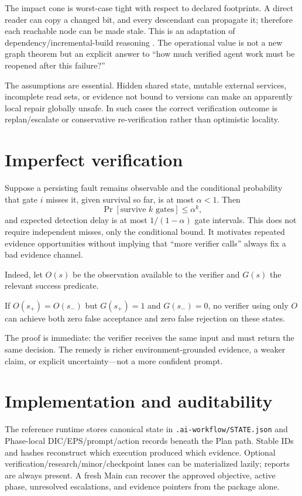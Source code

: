 \documentclass{article}
\begin{document}
The impact cone is worst-case tight with respect to declared footprints. A direct reader can copy a changed bit, and every descendant can propagate it; therefore each reachable node can be made stale. This is an adaptation of dependency/incremental-build reasoning \citep{mokhov2018build,acar2009selfadjusting}. The operational value is not a new graph theorem but an explicit answer to ``how much verified agent work must be reopened after this failure?''

The assumptions are essential. Hidden shared state, mutable external services, incomplete read sets, or evidence not bound to versions can make an apparently local repair globally unsafe. In such cases the correct verification outcome is replan/escalate or conservative re-verification rather than optimistic locality.

\section{Imperfect verification}
Suppose a persisting fault remains observable and the conditional probability that gate $i$ misses it, given survival so far, is at most $\alpha<1$. Then
\[
\Pr[\text{survive }k\text{ gates}]\le \alpha^k,
\]
and expected detection delay is at most $1/(1-\alpha)$ gate intervals. This does not require independent misses, only the conditional bound. It motivates repeated evidence opportunities without implying that ``more verifier calls'' always fix a bad evidence channel.

Indeed, let $O(s)$ be the observation available to the verifier and $G(s)$ the relevant success predicate.
\begin{proposition}
If $O(s_+)=O(s_-)$ but $G(s_+)=1$ and $G(s_-)=0$, no verifier using only $O$ can achieve both zero false acceptance and zero false rejection on these states.
\end{proposition}
The proof is immediate: the verifier receives the same input and must return the same decision. The remedy is richer environment-grounded evidence, a weaker claim, or explicit uncertainty---not a more confident prompt.

\section{Implementation and auditability}
The reference runtime stores canonical state in \texttt{.ai-workflow/STATE.json} and Phase-local DIC/EPS/prompt/action records beneath the Plan path. Stable IDs and hashes reconstruct which execution produced which evidence. Optional verification/research/minor/checkpoint lanes can be materialized lazily; reports are always present. A fresh Main can recover the approved objective, active phase, unresolved escalations, and evidence pointers from the package alone.
\end{document}
